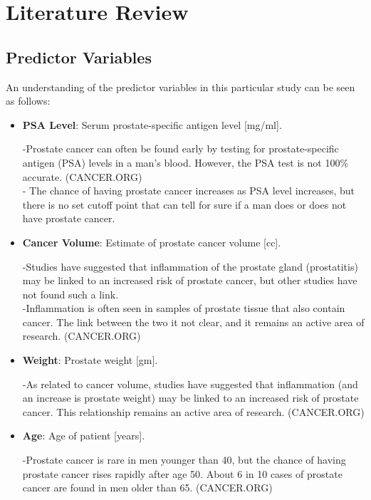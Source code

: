 %
%

\section{Literature Review}

\subsection{Predictor Variables}

\noindent An understanding of the predictor variables in this particular study can be seen as follows:

\begin{itemize}

	\item \textbf{PSA Level}: Serum prostate-specific antigen level [mg/ml]. \par
		-Prostate cancer can often be found early by testing for prostate-specific antigen (PSA) levels in a man's blood. However, the PSA test is not 100\% accurate. (CANCER.ORG) \\
		- The chance of having prostate cancer increases as PSA level increases, but there is no set cutoff point that can tell for sure if a man does or does not have prostate cancer.
		
	\item \textbf{Cancer Volume}: Estimate of prostate cancer volume [cc]. \par
		-Studies have suggested that inflammation of the prostate gland (prostatitis) may be linked to an increased risk of prostate cancer, but other studies have not found such a link. \\
		-Inflammation is often seen in samples of prostate tissue that also contain cancer. The link between the two it not clear, and it remains an active area of research. (CANCER.ORG)
		
	\item \textbf{Weight}: Prostate weight [gm]. \par
		-As related to cancer volume, studies have suggested that inflammation (and an increase is prostate weight) may be linked to an increased risk of prostate cancer. This relationship remains an active area of research. (CANCER.ORG)
		
	\item \textbf{Age}: Age of patient [years]. \par	
		-Prostate cancer is rare in men younger than 40, but the chance of having prostate cancer rises rapidly after age 50. About 6 in 10 cases of prostate cancer are found in men older than 65. (CANCER.ORG)
		

\end{itemize}

